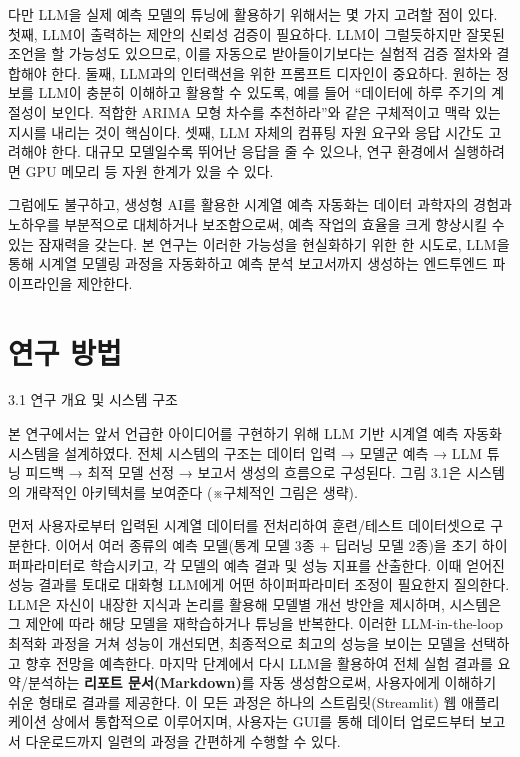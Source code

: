 \documentclass[12pt,ko,a4,]{report}
\begin{document}
다만 LLM을 실제 예측 모델의 튜닝에 활용하기 위해서는 몇 가지 고려할 점이
있다. 첫째, LLM이 출력하는 제안의 신뢰성 검증이 필요하다. LLM이
그럴듯하지만 잘못된 조언을 할 가능성도 있으므로, 이를 자동으로
받아들이기보다는 실험적 검증 절차와 결합해야 한다. 둘째, LLM과의
인터랙션을 위한 프롬프트 디자인이 중요하다. 원하는 정보를 LLM이 충분히
이해하고 활용할 수 있도록, 예를 들어 ``데이터에 하루 주기의 계절성이
보인다. 적합한 ARIMA 모형 차수를 추천하라''와 같은 구체적이고 맥락 있는
지시를 내리는 것이 핵심이다. 셋째, LLM 자체의 컴퓨팅 자원 요구와 응답
시간도 고려해야 한다. 대규모 모델일수록 뛰어난 응답을 줄 수 있으나, 연구
환경에서 실행하려면 GPU 메모리 등 자원 한계가 있을 수 있다.

그럼에도 불구하고, 생성형 AI를 활용한 시계열 예측 자동화는 데이터
과학자의 경험과 노하우를 부분적으로 대체하거나 보조함으로써, 예측 작업의
효율을 크게 향상시킬 수 있는 잠재력을 갖는다. 본 연구는 이러한 가능성을
현실화하기 위한 한 시도로, LLM을 통해 시계열 모델링 과정을 자동화하고
예측 분석 보고서까지 생성하는 엔드투엔드 파이프라인을 제안한다.

\chapter{연구 방법}

3.1 연구 개요 및 시스템 구조

본 연구에서는 앞서 언급한 아이디어를 구현하기 위해 LLM 기반 시계열 예측
자동화 시스템을 설계하였다. 전체 시스템의 구조는 데이터 입력 → 모델군
예측 → LLM 튜닝 피드백 → 최적 모델 선정 → 보고서 생성의 흐름으로
구성된다. 그림 3.1은 시스템의 개략적인 아키텍처를 보여준다 (※구체적인
그림은 생략).

먼저 사용자로부터 입력된 시계열 데이터를 전처리하여 훈련/테스트
데이터셋으로 구분한다. 이어서 여러 종류의 예측 모델(통계 모델 3종 +
딥러닝 모델 2종)을 초기 하이퍼파라미터로 학습시키고, 각 모델의 예측 결과
및 성능 지표를 산출한다. 이때 얻어진 성능 결과를 토대로 대화형 LLM에게
어떤 하이퍼파라미터 조정이 필요한지 질의한다. LLM은 자신이 내장한 지식과
논리를 활용해 모델별 개선 방안을 제시하며, 시스템은 그 제안에 따라 해당
모델을 재학습하거나 튜닝을 반복한다. 이러한 LLM-in-the-loop 최적화
과정을 거쳐 성능이 개선되면, 최종적으로 최고의 성능을 보이는 모델을
선택하고 향후 전망을 예측한다. 마지막 단계에서 다시 LLM을 활용하여 전체
실험 결과를 요약/분석하는 \textbf{리포트 문서(Markdown)}를 자동
생성함으로써, 사용자에게 이해하기 쉬운 형태로 결과를 제공한다. 이 모든
과정은 하나의 스트림릿(Streamlit) 웹 애플리케이션 상에서 통합적으로
이루어지며, 사용자는 GUI를 통해 데이터 업로드부터 보고서 다운로드까지
일련의 과정을 간편하게 수행할 수 있다.
\end{document}
